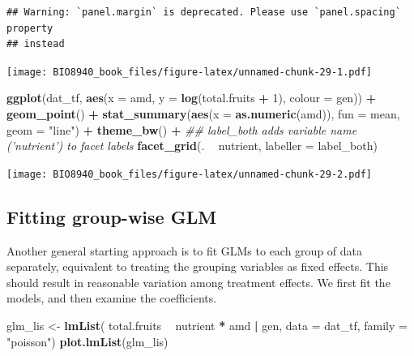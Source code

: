 \documentclass[
  12pt,
]{book}
\newenvironment{Shaded}{\begin{snugshade}}{\end{snugshade}}
\newcommand{\CommentTok}[1]{\textcolor[rgb]{0.56,0.35,0.01}{\textit{#1}}}
\newcommand{\DataTypeTok}[1]{\textcolor[rgb]{0.13,0.29,0.53}{#1}}
\newcommand{\DecValTok}[1]{\textcolor[rgb]{0.00,0.00,0.81}{#1}}
\newcommand{\KeywordTok}[1]{\textcolor[rgb]{0.13,0.29,0.53}{\textbf{#1}}}
\newcommand{\NormalTok}[1]{#1}
\newcommand{\OperatorTok}[1]{\textcolor[rgb]{0.81,0.36,0.00}{\textbf{#1}}}
\newcommand{\StringTok}[1]{\textcolor[rgb]{0.31,0.60,0.02}{#1}}
\begin{document}
\begin{verbatim}
## Warning: `panel.margin` is deprecated. Please use `panel.spacing` property
## instead
\end{verbatim}

\texttt{[image: BIO8940\_book\_files/figure-latex/unnamed-chunk-29-1.pdf]}

\begin{Shaded}
\begin{Highlighting}[]
\KeywordTok{ggplot}\NormalTok{(dat_tf, }\KeywordTok{aes}\NormalTok{(}\DataTypeTok{x =}\NormalTok{ amd, }\DataTypeTok{y =} \KeywordTok{log}\NormalTok{(total.fruits }\OperatorTok{+}\StringTok{ }\DecValTok{1}\NormalTok{), }\DataTypeTok{colour =}\NormalTok{ gen)) }\OperatorTok{+}
\StringTok{  }\KeywordTok{geom_point}\NormalTok{() }\OperatorTok{+}
\StringTok{  }\KeywordTok{stat_summary}\NormalTok{(}\KeywordTok{aes}\NormalTok{(}\DataTypeTok{x =} \KeywordTok{as.numeric}\NormalTok{(amd)), }\DataTypeTok{fun =}\NormalTok{ mean, }\DataTypeTok{geom =} \StringTok{"line"}\NormalTok{) }\OperatorTok{+}
\StringTok{  }\KeywordTok{theme_bw}\NormalTok{() }\OperatorTok{+}
\StringTok{  }\CommentTok{## label_both adds variable name ('nutrient') to facet labels}
\StringTok{  }\KeywordTok{facet_grid}\NormalTok{(. }\OperatorTok{~}\StringTok{ }\NormalTok{nutrient, }\DataTypeTok{labeller =}\NormalTok{ label_both)}
\end{Highlighting}
\end{Shaded}

\texttt{[image: BIO8940\_book\_files/figure-latex/unnamed-chunk-29-2.pdf]}

\hypertarget{fitting-group-wise-glm}{%
\subsection{Fitting group-wise GLM}\label{fitting-group-wise-glm}}

Another general starting approach is to fit GLMs to each group of data separately, equivalent to treating the grouping variables as fixed effects.
This should result in reasonable variation among treatment effects. We first fit the models, and then examine the coefficients.

\begin{Shaded}
\begin{Highlighting}[]
\NormalTok{glm_lis <-}\StringTok{ }\KeywordTok{lmList}\NormalTok{(}
\NormalTok{  total.fruits }\OperatorTok{~}\StringTok{ }\NormalTok{nutrient }\OperatorTok{*}\StringTok{ }\NormalTok{amd }\OperatorTok{|}\StringTok{ }\NormalTok{gen,}
  \DataTypeTok{data =}\NormalTok{ dat_tf,}
  \DataTypeTok{family =} \StringTok{"poisson"}\NormalTok{)}
\KeywordTok{plot.lmList}\NormalTok{(glm_lis)}
\end{Highlighting}
\end{Shaded}
\end{document}
